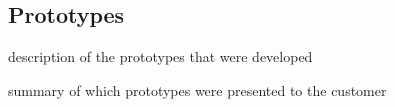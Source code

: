 \subsection{Prototypes}\label{sec:sprint2:prototypes}
description of the prototypes that were developed

summary of which prototypes were presented to the customer